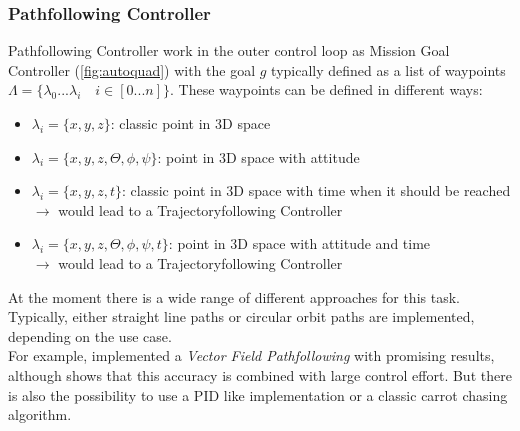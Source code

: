 \subsubsection{Pathfollowing Controller}
Pathfollowing Controller work in the outer control loop as Mission Goal Controller (\cref{fig:autoquad}) with the goal $g$ typically defined as a list of waypoints $\Lambda = \{ \lambda_0 ... \lambda_i \quad i \in [0...n]\}$. These waypoints can be defined in different ways:
\begin{itemize}
	\item  $\lambda_i = \{x,y,z\}$: classic point in 3D space
	\item  $\lambda_i = \{x,y,z,\Theta, \phi, \psi\}$: point in 3D space with attitude
	\item  $\lambda_i = \{x,y,z,t\}$: classic point in 3D space with time when it should be reached\\
	$\rightarrow$ would lead to a Trajectoryfollowing Controller
	\item  $\lambda_i = \{x,y,z,\Theta, \phi, \psi, t\}$: point in 3D space with attitude and time\\
	$\rightarrow$ would lead to a Trajectoryfollowing Controller
\end{itemize}
At the moment there is a wide range of different approaches for this task. Typically,
either straight line paths or circular orbit paths are implemented, depending on the use case.\\
For example, \cite{nelson2007vector} implemented a \emph{Vector Field Pathfollowing} with promising results, although \cite{6669680} shows that this accuracy is combined with large control effort. But there is also the possibility to use a PID like implementation or a classic carrot chasing algorithm.\\

\newpage

